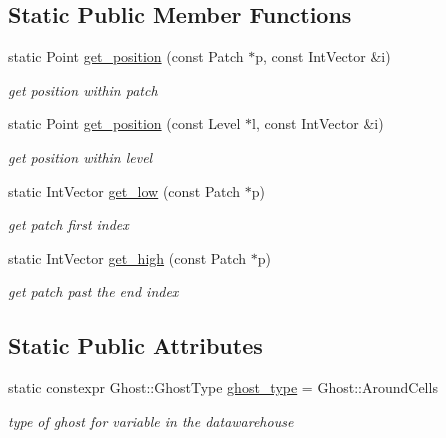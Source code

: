 \subsection*{Static Public Member Functions}
\begin{DoxyCompactItemize}
\item 
static Point \hyperlink{classUintah_1_1PhaseField_1_1detail_1_1dw__interface0_3_01CC_01_4_a2643a66e4e8bd62de7382177db262f6d}{get\+\_\+position} (const Patch $\ast$p, const Int\+Vector \&i)
\begin{DoxyCompactList}\small\item\em get position within patch \end{DoxyCompactList}\item 
static Point \hyperlink{classUintah_1_1PhaseField_1_1detail_1_1dw__interface0_3_01CC_01_4_a0dd7b14ca510edbf480c3a54f92f978c}{get\+\_\+position} (const Level $\ast$l, const Int\+Vector \&i)
\begin{DoxyCompactList}\small\item\em get position within level \end{DoxyCompactList}\item 
static Int\+Vector \hyperlink{classUintah_1_1PhaseField_1_1detail_1_1dw__interface0_3_01CC_01_4_aa5eb357ac72806395c26237ed8f99d35}{get\+\_\+low} (const Patch $\ast$p)
\begin{DoxyCompactList}\small\item\em get patch first index \end{DoxyCompactList}\item 
static Int\+Vector \hyperlink{classUintah_1_1PhaseField_1_1detail_1_1dw__interface0_3_01CC_01_4_ac43d60210f4efd7ffa0ca62788161f8a}{get\+\_\+high} (const Patch $\ast$p)
\begin{DoxyCompactList}\small\item\em get patch past the end index \end{DoxyCompactList}\end{DoxyCompactItemize}
\subsection*{Static Public Attributes}
\begin{DoxyCompactItemize}
\item 
static constexpr Ghost\+::\+Ghost\+Type \hyperlink{classUintah_1_1PhaseField_1_1detail_1_1dw__interface0_3_01CC_01_4_a95c8e4cca1a77793692a758d06dac8a5}{ghost\+\_\+type} = Ghost\+::\+Around\+Cells
\begin{DoxyCompactList}\small\item\em type of ghost for variable in the datawarehouse \end{DoxyCompactList}\end{DoxyCompactItemize}
